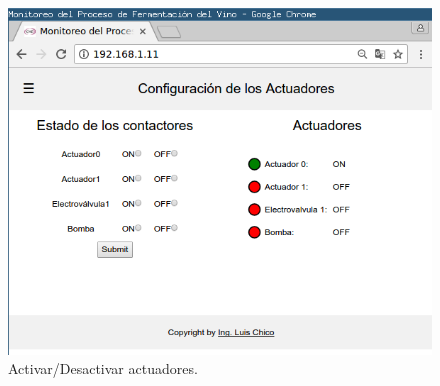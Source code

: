 \begin{figure}[h]
  \centering
  \includegraphics[scale=.25]{./Figures/config_act.png}
  \caption{ Activar/Desactivar actuadores.}
  \label{fig:web_act}
\end{figure}

